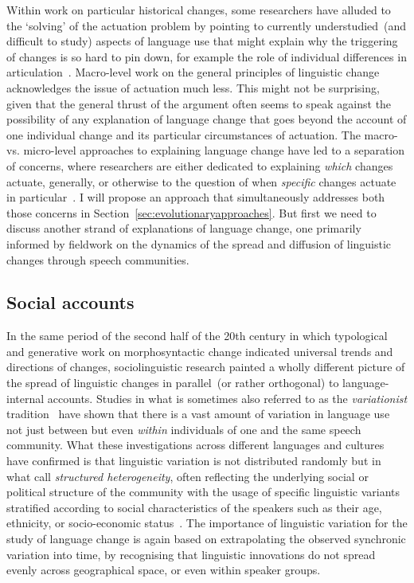 Within work on particular historical changes, some researchers have alluded to the `solving' of the actuation problem by pointing to currently understudied~(and difficult to study) aspects of language use that might explain why the triggering of changes is so hard to pin down, for example the role of individual differences in articulation~\citep{Baker2011,Stevens2013}.
Macro-level work on the general principles of linguistic change acknowledges the issue of actuation much less. This might not be surprising, given that the general thrust of the argument often seems to speak against the possibility of any explanation of language change that goes beyond the account of one individual change and its particular circumstances of actuation.
The macro- vs. micro-level approaches to explaining language change have led to a separation of concerns, where researchers are either dedicated to explaining \emph{which} changes actuate, generally, or otherwise to the question of when \emph{specific} changes actuate in particular~\citet{Bynon1977}. I will propose an approach that simultaneously addresses both those concerns in Section~\ref{sec:evolutionaryapproaches}. But first we need to discuss another strand of explanations of language change, one primarily informed by fieldwork on the dynamics of the spread and diffusion of linguistic changes through speech communities.

\subsection{Social accounts}
\label{sec:socialaccounts}

In the same period of the second half of the 20th century in which typological and generative work on morphosyntactic change indicated universal trends and directions of changes, sociolinguistic research %
painted a wholly different picture of the spread of linguistic changes in parallel~(or rather orthogonal) to language-internal accounts.
Studies in what is sometimes also referred to as the \emph{variationist} tradition~\citep{Tagliamonte2015} have shown that there is a vast amount of variation in language use not just between but even \emph{within} individuals of one and the same speech community.
What these investigations across different languages and cultures have confirmed is that linguistic variation is not distributed randomly but in what \citet{Weinreich1968} call \emph{structured heterogeneity}, often reflecting the underlying social or political structure of the community with the usage of specific linguistic variants stratified according to social characteristics of the speakers such as their age, ethnicity, or socio-economic status~\citep{Foulkes2006,Tagliamonte2012}.
The importance of linguistic variation for the study of language change is again based on extrapolating the observed synchronic variation into time, by recognising that linguistic innovations do not spread evenly across geographical space, or even within speaker groups.

